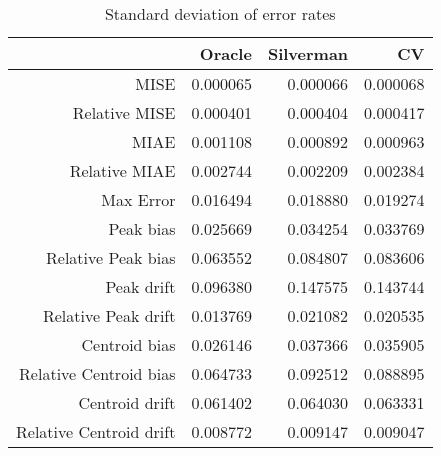 \begin{table}[ht]
\centering
\begin{tabular}{rrrr}
  \hline
 & Oracle & Silverman & CV \\ 
  \hline
MISE & 0.000065 & 0.000066 & 0.000068 \\ 
  Relative MISE & 0.000401 & 0.000404 & 0.000417 \\ 
  MIAE & 0.001108 & 0.000892 & 0.000963 \\ 
  Relative MIAE & 0.002744 & 0.002209 & 0.002384 \\ 
  Max Error & 0.016494 & 0.018880 & 0.019274 \\ 
  Peak bias & 0.025669 & 0.034254 & 0.033769 \\ 
  Relative Peak bias & 0.063552 & 0.084807 & 0.083606 \\ 
  Peak drift & 0.096380 & 0.147575 & 0.143744 \\ 
  Relative Peak drift & 0.013769 & 0.021082 & 0.020535 \\ 
  Centroid bias & 0.026146 & 0.037366 & 0.035905 \\ 
  Relative Centroid bias & 0.064733 & 0.092512 & 0.088895 \\ 
  Centroid drift & 0.061402 & 0.064030 & 0.063331 \\ 
  Relative Centroid drift & 0.008772 & 0.009147 & 0.009047 \\ 
   \hline
\end{tabular}
\caption{Standard deviation of error rates} 
\label{tbl:stddev_error_rates}
\end{table}
